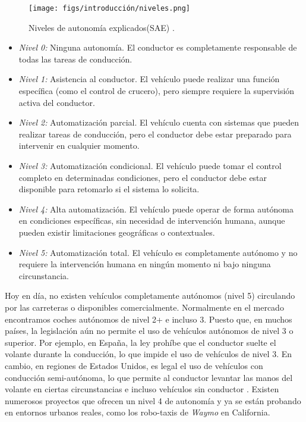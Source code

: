 \newpage

\begin{figure} [ht]
\begin{center}
\texttt{[image: figs/introducción/niveles.png]}
\end{center}
\caption{Niveles de autonomía explicados(\ac{SAE}) \cite{autobild-autonomous}.}
\label{aut-levels}
\end{figure}

\begin{itemize}
\item \textit{Nivel 0:} Ninguna autonomía. El conductor es completamente responsable de todas las tareas de conducción.
\item \textit{Nivel 1:} Asistencia al conductor. El vehículo puede realizar una función específica (como el control de crucero), pero siempre requiere la supervisión activa del conductor.
\item \textit{Nivel 2:} Automatización parcial. El vehículo cuenta con sistemas que pueden realizar tareas de conducción, pero el conductor debe estar preparado para intervenir en cualquier momento.
\item \textit{Nivel 3:} Automatización condicional. El vehículo puede tomar el control completo en determinadas condiciones, pero el conductor debe estar disponible para retomarlo si el sistema lo solicita.
\item \textit{Nivel 4:} Alta automatización. El vehículo puede operar de forma autónoma en condiciones específicas, sin necesidad de intervención humana, aunque pueden existir limitaciones geográficas o contextuales.
\item \textit{Nivel 5:} Automatización total. El vehículo es completamente autónomo y no requiere la intervención humana en ningún momento ni bajo ninguna circunstancia.
\end{itemize}

Hoy en día, no existen vehículos completamente autónomos (nivel 5) circulando por las carreteras o disponibles comercialmente. Normalmente en el mercado encontramos coches autónomos de nivel 2+ e incluso 3. Puesto que, en muchos países, la legislación aún no permite el uso de vehículos autónomos de nivel 3 o superior. Por ejemplo, en España, la ley prohíbe que el conductor suelte el volante durante la conducción, lo que impide el uso de vehículos de nivel 3. En cambio, en regiones de Estados Unidos, es legal el uso de vehículos con conducción semi-autónoma, lo que permite al conductor levantar las manos del volante en ciertas circunstancias e incluso vehículos sin conductor \cite{carwow-autonomous}. Existen numerosos proyectos que ofrecen un nivel 4 de autonomía y ya se están probando en entornos urbanos reales, como los robo-taxis de \textit{Waymo} en California. 

